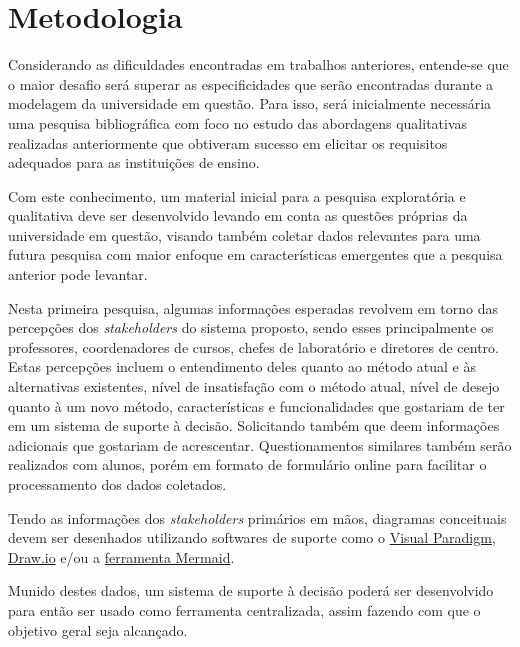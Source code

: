 \chapter{Metodologia}

Considerando as dificuldades encontradas em trabalhos anteriores, entende-se que o maior desafio será superar as especificidades que serão encontradas durante a modelagem da universidade em questão. Para isso, será inicialmente necessária uma pesquisa bibliográfica com foco no estudo das abordagens qualitativas realizadas anteriormente que obtiveram sucesso em elicitar os requisitos adequados para as instituições de ensino.


Com este conhecimento, um material inicial para a pesquisa exploratória e qualitativa deve ser desenvolvido levando em conta as questões próprias da universidade em questão, visando também coletar dados relevantes para uma futura pesquisa com maior enfoque em características emergentes que a pesquisa anterior pode levantar.

Nesta primeira pesquisa, algumas informações esperadas revolvem em torno das percepções dos \textit{stakeholders} do sistema proposto, sendo esses principalmente os professores, coordenadores de cursos, chefes de laboratório e diretores de centro. Estas percepções incluem o entendimento deles quanto ao método atual e às alternativas existentes, nível de insatisfação com o método atual, nível de desejo quanto à um novo método, características e funcionalidades que gostariam de ter em um sistema de suporte à decisão. Solicitando também que deem informações adicionais que gostariam de acrescentar. Questionamentos similares também serão realizados com alunos, porém em formato de formulário online para facilitar o processamento dos dados coletados.

Tendo as informações dos \textit{stakeholders} primários em mãos, diagramas conceituais devem ser desenhados utilizando softwares de suporte como o \href{https://www.visual-paradigm.com/}{Visual Paradigm}, \href{drawio.com}{Draw.io} e/ou a \href{https://mermaid.js.org/}{ferramenta Mermaid}.

Munido destes dados, um sistema de suporte à decisão poderá ser desenvolvido para então ser usado como ferramenta centralizada, assim fazendo com que o objetivo geral seja alcançado.
